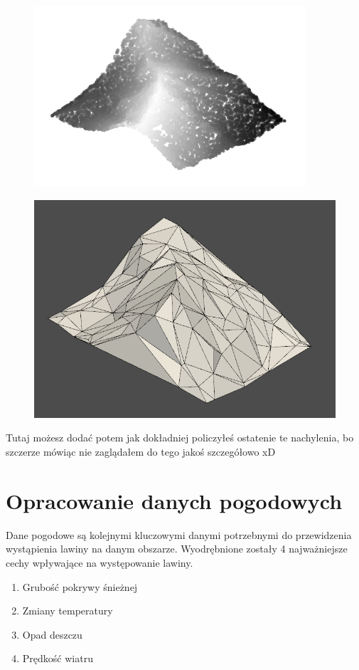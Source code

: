 \begin{figure}[h]
	\centering
	\begin{minipage}{.5\textwidth}
		\centering
		\includegraphics[width=.6\linewidth]{no_delaunay}
		\label{fig:test1}
	\end{minipage}%
	\begin{minipage}{.5\textwidth}
		\centering
		\includegraphics[width=.6\linewidth]{delaunay}
		\label{fig:test2}
	\end{minipage}
\end{figure}
Tutaj możesz dodać potem jak dokładniej policzyłeś ostatenie te nachylenia, bo szczerze mówiąc nie zaglądałem do tego jakoś szczegółowo xD
\clearpage


\section{Opracowanie danych pogodowych}
\label{sec:kompilacja}


Dane pogodowe są kolejnymi kluczowymi danymi potrzebnymi do przewidzenia wystąpienia lawiny na danym obszarze. Wyodrębnione zostały 4 najważniejsze cechy wpływające na występowanie lawiny.
\begin{enumerate}
	\item Grubość pokrywy śnieżnej
	\item Zmiany temperatury
	\item Opad deszczu
	\item Prędkość wiatru
\end{enumerate}
